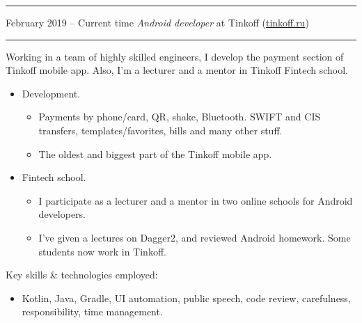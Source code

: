 \documentclass[11pt]{article}
\newcommand\CvSmallSkipLength{0.5em}
\newcommand\CvSkip[1]{\vspace{#1}}
\newcommand\CvSmallSkip{\CvSkip{\CvSmallSkipLength}}
\newcommand\CvRule{\begingroup\color{CvRuleColor}\hrule\endgroup}
\newcommand\CvWorkplaceHeader[5]{\begingroup%
	\CvRule%
	\fboxsep0pt%
	\colorbox{CvWorkplaceHeaderColor}{%
		\begin{minipage}{\linewidth-2\fboxsep}%
			\CvSmallSkip%
			#1 -- #2 \hfill \textit{#3} at #4 (\href{http://#5/}{#5})%
			\CvSmallSkip%
		\end{minipage}%
	}%
	\CvRule%
	\endgroup%
}
\newenvironment{CvWorkplaceDescription}{%
	\begingroup\setlength\parskip{\CvSmallSkipLength}%
}{%
	\CvSmallSkip\endgroup%
}
\begin{document}
	\CvWorkplaceHeader{February 2019}{Current time}{Android developer}{Tinkoff}{tinkoff.ru}
	\begin{CvWorkplaceDescription}
		Working in a team of highly skilled engineers, I develop the payment section of Tinkoff mobile app. Also, I'm a lecturer and a mentor in Tinkoff Fintech school.
		\begin{itemize}[noitemsep]
			\item Development.
			\begin{itemize}
				\item Payments by phone/card, QR, shake, Bluetooth. SWIFT and CIS transfers, templates/favorites, bills and many other stuff.
				\item The oldest and biggest part of the Tinkoff mobile app.
			\end{itemize}
			
			\item Fintech school.
			\begin{itemize}
				\item I participate as a lecturer and a mentor in two online schools for Android developers. 
				\item I've given a lectures on Dagger2, and reviewed Android homework. Some students now work in Tinkoff. 
			\end{itemize}
		\end{itemize}
		
		Key skills \& technologies employed:
		\begin{itemize}[noitemsep]
			\item Kotlin, Java, Gradle, UI automation, public speech, code review, carefulness, responsibility, time management. 
		\end{itemize}
		
		
	\end{CvWorkplaceDescription}
	
\end{document}
